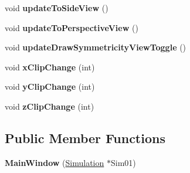 \begin{DoxyCompactItemize}
\item 
\hypertarget{classMainWindow_a0a6e65fa32274c4a7fecb7ca04795388}{}void {\bfseries update\+To\+Side\+View} ()\label{classMainWindow_a0a6e65fa32274c4a7fecb7ca04795388}

\item 
\hypertarget{classMainWindow_a1607a9c35bde875a8218c763204e4fcf}{}void {\bfseries update\+To\+Perspective\+View} ()\label{classMainWindow_a1607a9c35bde875a8218c763204e4fcf}

\item 
\hypertarget{classMainWindow_a43031416fc2795d2b3cda8a158476549}{}void {\bfseries update\+Draw\+Symmetricity\+View\+Toggle} ()\label{classMainWindow_a43031416fc2795d2b3cda8a158476549}

\item 
\hypertarget{classMainWindow_ab677ef1bf70bc78faa5680576c14cd22}{}void {\bfseries x\+Clip\+Change} (int)\label{classMainWindow_ab677ef1bf70bc78faa5680576c14cd22}

\item 
\hypertarget{classMainWindow_a019023e11d09610ad8632baeb6854c61}{}void {\bfseries y\+Clip\+Change} (int)\label{classMainWindow_a019023e11d09610ad8632baeb6854c61}

\item 
\hypertarget{classMainWindow_af30a90f508a3d0b4434ddcaf848c69ac}{}void {\bfseries z\+Clip\+Change} (int)\label{classMainWindow_af30a90f508a3d0b4434ddcaf848c69ac}

\end{DoxyCompactItemize}
\subsection*{Public Member Functions}
\begin{DoxyCompactItemize}
\item 
\hypertarget{classMainWindow_ad1197b787cbc413b1b4c8c7bd15532f4}{}{\bfseries Main\+Window} (\hyperlink{classSimulation}{Simulation} $\ast$Sim01)\label{classMainWindow_ad1197b787cbc413b1b4c8c7bd15532f4}

\end{DoxyCompactItemize}
